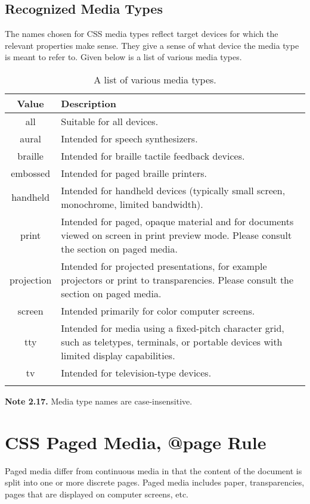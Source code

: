 \documentclass[a4paper,oneside]{book}
\numberwithin{equation}{chapter}
\begin{document}
\subsection{Recognized Media Types}
The names chosen for CSS media types reflect target devices for which the relevant properties make sense. They give a sense of what device the media type is meant to refer to. Given below is a list of various media types.
\begin{center}
\begin{longtable}{|c|p{9cm}|}
\hline
\textbf{Value} & \textbf{Description}\\
\hline
all & Suitable for all devices.\\
\hline
aural & Intended for speech synthesizers.\\
\hline
braille & Intended for braille tactile feedback devices.\\
\hline
embossed & Intended for paged braille printers.\\
\hline
handheld & Intended for handheld devices (typically small screen, monochrome, limited bandwidth).\\
\hline
print & Intended for paged, opaque material and for documents viewed on screen in print preview mode. Please consult the section on paged media.\\
\hline
projection & Intended for projected presentations, for example projectors or print to transparencies. Please consult the section on paged media.\\
\hline
screen &	Intended primarily for color computer screens.\\
\hline
tty & Intended for media using a fixed-pitch character grid, such as teletypes, terminals, or portable devices with limited display capabilities.\\
\hline
tv &	Intended for television-type devices.\\
\hline
\caption{A list of various media types.}
\end{longtable}
\end{center}
\textbf{Note 2.17.} Media type names are case-insensitive.
\section{CSS Paged Media, @page Rule}
Paged media differ from continuous media in that the content of the document is split into one or more discrete pages. Paged media includes paper, transparencies, pages that are displayed on computer screens, etc.
\end{document}
